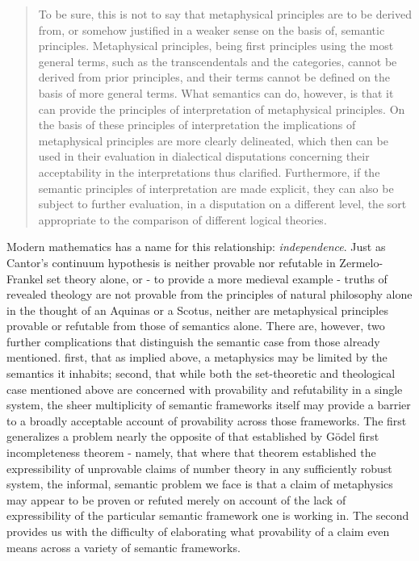 \documentclass[]{article}
\begin{document}
\begin{quote}
To be sure, this is not to say that metaphysical principles are to be derived from, or somehow justified 
in a weaker sense on the basis of, semantic principles. Metaphysical principles, being first principles 
using the most general terms, such as the transcendentals and the categories, cannot be derived from 
prior principles, and their terms cannot be defined on the basis of more general terms. What 
semantics can do, however, is that it can provide the principles of interpretation of metaphysical 
principles. On the basis of these principles of interpretation the implications of metaphysical 
principles are more clearly delineated, which then can be used in their evaluation in dialectical 
disputations concerning their acceptability in the interpretations thus clarified. Furthermore, if the 
semantic principles of interpretation are made explicit, they can also be subject to further evaluation, 
in a disputation on a different level, the sort appropriate to the comparison of different logical 
theories.  \autocite[49]{Klima2011b}
\end{quote}

Modern mathematics has a name for this relationship: \emph{independence}. Just as Cantor's continuum hypothesis is neither provable nor refutable in Zermelo-Frankel set theory alone, 
or - to provide a more medieval example - truths of revealed theology are not provable from the principles of natural philosophy alone in the thought of an Aquinas or a Scotus, 
neither are metaphysical principles provable or refutable from those of semantics alone. 
There are, however, two further complications that distinguish the semantic case from those already mentioned. 
first, that as implied above, a metaphysics may be limited by the semantics it inhabits;
second, that while both the set-theoretic and theological case mentioned above are concerned with provability and refutability in a single system, 
the sheer multiplicity of semantic frameworks itself may provide a barrier to a broadly acceptable account of provability across those frameworks.
The first generalizes a problem nearly the opposite of that established by G\"{o}del first incompleteness theorem - 
namely, that where that theorem established the expressibility of unprovable claims of number theory in any sufficiently robust system, 
the informal, semantic problem we face is that a claim of metaphysics may appear to be proven or refuted merely on account of the lack of expressibility of the particular semantic framework one is working in. 
The second provides us with the difficulty of elaborating what provability of a claim even means across a variety of semantic frameworks.
\end{document}
